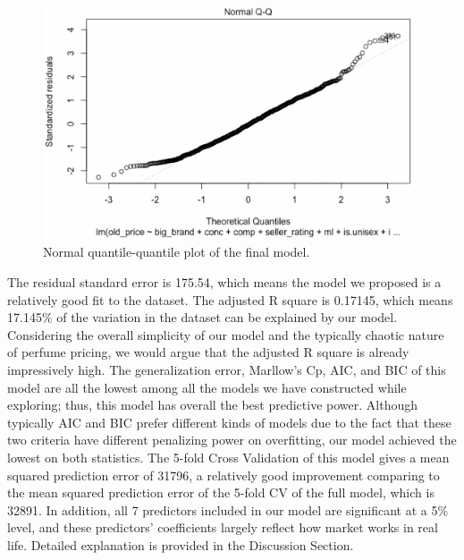 \documentclass[12pt]{amsart}
\begin{document}
\begin{figure}[H]
    \centering
    \includegraphics[width = 0.8\linewidth]{423QQPlot.png}
    \caption{Normal quantile-quantile plot of the final model.}
    \label{QQPlot}
\end{figure}

The residual standard error is 175.54, which means the model we proposed is a relatively 
good fit to the dataset. The adjusted R square is 0.17145, which means 17.145\% of the variation 
in the dataset can be explained by our model. Considering the overall simplicity of our model 
and the typically chaotic nature of perfume pricing, we would argue that the adjusted R square is 
already impressively high. The generalization error, Marllow’s Cp, AIC, and BIC of this model 
are all the lowest among all the models we have constructed while exploring; thus, this model 
has overall the best predictive power. Although typically AIC and BIC prefer different kinds of 
models due to the fact that these two criteria have different penalizing power on overfitting, our 
model achieved the lowest on both statistics. The 5-fold Cross Validation of this model gives a
mean squared prediction error of 31796, a relatively good improvement comparing to the mean 
squared prediction error of the 5-fold CV of the full model, which is 32891. In addition, all 7 
predictors included in our model are significant at a 5\% level, and these predictors’ coefficients 
largely reflect how market works in real life. Detailed explanation is provided in the Discussion Section.
\end{document}

